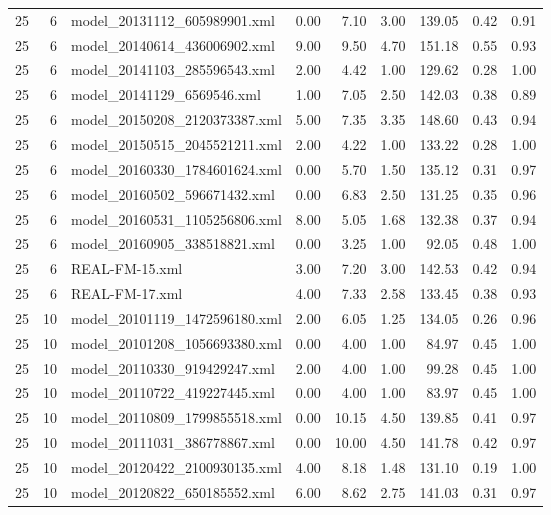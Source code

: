 \begin{table}[ht]
\begin{tabular}{rrlrrrrrr}
   25 &   6 & model\_20131112\_605989901.xml & 0.00 & 7.10 & 3.00 & 139.05 & 0.42 & 0.91 \\ 
   25 &   6 & model\_20140614\_436006902.xml & 9.00 & 9.50 & 4.70 & 151.18 & 0.55 & 0.93 \\ 
   25 &   6 & model\_20141103\_285596543.xml & 2.00 & 4.42 & 1.00 & 129.62 & 0.28 & 1.00 \\ 
   25 &   6 & model\_20141129\_6569546.xml & 1.00 & 7.05 & 2.50 & 142.03 & 0.38 & 0.89 \\ 
   25 &   6 & model\_20150208\_2120373387.xml & 5.00 & 7.35 & 3.35 & 148.60 & 0.43 & 0.94 \\ 
   25 &   6 & model\_20150515\_2045521211.xml & 2.00 & 4.22 & 1.00 & 133.22 & 0.28 & 1.00 \\ 
   25 &   6 & model\_20160330\_1784601624.xml & 0.00 & 5.70 & 1.50 & 135.12 & 0.31 & 0.97 \\ 
   25 &   6 & model\_20160502\_596671432.xml & 0.00 & 6.83 & 2.50 & 131.25 & 0.35 & 0.96 \\ 
   25 &   6 & model\_20160531\_1105256806.xml & 8.00 & 5.05 & 1.68 & 132.38 & 0.37 & 0.94 \\ 
   25 &   6 & model\_20160905\_338518821.xml & 0.00 & 3.25 & 1.00 & 92.05 & 0.48 & 1.00 \\ 
   25 &   6 & REAL-FM-15.xml & 3.00 & 7.20 & 3.00 & 142.53 & 0.42 & 0.94 \\ 
   25 &   6 & REAL-FM-17.xml & 4.00 & 7.33 & 2.58 & 133.45 & 0.38 & 0.93 \\ 
   25 &  10 & model\_20101119\_1472596180.xml & 2.00 & 6.05 & 1.25 & 134.05 & 0.26 & 0.96 \\ 
   25 &  10 & model\_20101208\_1056693380.xml & 0.00 & 4.00 & 1.00 & 84.97 & 0.45 & 1.00 \\ 
   25 &  10 & model\_20110330\_919429247.xml & 2.00 & 4.00 & 1.00 & 99.28 & 0.45 & 1.00 \\ 
   25 &  10 & model\_20110722\_419227445.xml & 0.00 & 4.00 & 1.00 & 83.97 & 0.45 & 1.00 \\ 
   25 &  10 & model\_20110809\_1799855518.xml & 0.00 & 10.15 & 4.50 & 139.85 & 0.41 & 0.97 \\ 
   25 &  10 & model\_20111031\_386778867.xml & 0.00 & 10.00 & 4.50 & 141.78 & 0.42 & 0.97 \\ 
   25 &  10 & model\_20120422\_2100930135.xml & 4.00 & 8.18 & 1.48 & 131.10 & 0.19 & 1.00 \\ 
   25 &  10 & model\_20120822\_650185552.xml & 6.00 & 8.62 & 2.75 & 141.03 & 0.31 & 0.97 \\ 

\end{tabular}
\end{table}
